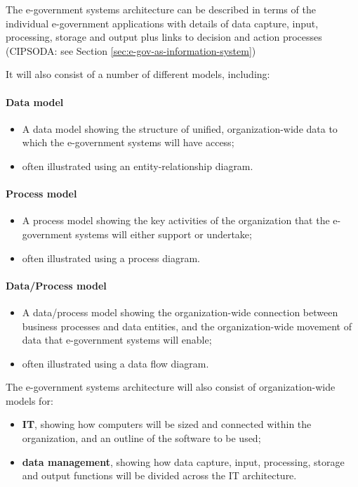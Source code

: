 The e-government systems architecture
can be described in terms of the individual
e-government applications with details of
data capture, input, processing, storage and
output plus links to decision and action
processes (CIPSODA: see Section \ref{sec:e-gov-as-information-system}) 

It will also consist of a number of different models, including:

\paragraph*{Data model}
\begin{itemize}
	\item A data model showing the structure of unified, organization-wide data to
	which the e-government systems will	have access; 
	\item often illustrated using an entity-relationship diagram.
\end{itemize}

\paragraph*{Process model}
\begin{itemize}
	\item A process model showing the key activities of the organization that the e-government systems will either support or undertake; 
	\item often illustrated using a process	diagram.
\end{itemize}


\paragraph*{Data/Process model}
\begin{itemize}
	\item A data/process model showing the organization-wide connection between
	business processes and data entities, and the organization-wide movement of data
	that e-government systems will enable;
	
	\item often illustrated using a data flow diagram.
\end{itemize}


The e-government systems architecture will
also consist of organization-wide models
for:

\begin{itemize}
	\item \textbf{IT}, showing how computers will be sized
	and connected within the organization,
	and an outline of the software to be used;
	\item \textbf{data management}, showing how data
	capture, input, processing, storage and
	output functions will be divided across
	the IT architecture.
\end{itemize}

